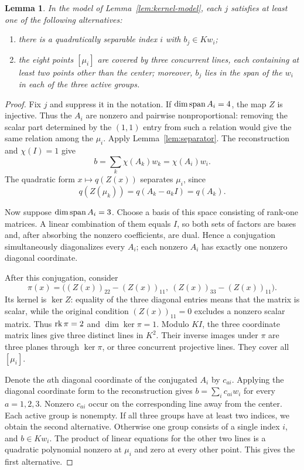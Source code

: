 \documentclass[11pt,a4paper]{article}
\numberwithin{equation}{section}
\theoremstyle{plain}
\newtheorem{lemma}[theorem]{Lemma}
\theoremstyle{definition}
\begin{document}
\begin{lemma}\label{lem:slice-dichotomy}
In the model of Lemma~\ref{lem:kernel-model}, each $j$ satisfies at
least one of the following alternatives:
\begin{enumerate}
\item there is a quadratically separable index $i$ with $b_j\in Kw_i$;
\item the eight points $[\mu_i]$ are covered by three concurrent
lines, each containing at least two points other than the center;
moreover, $b_j$ lies in the span of the $w_i$ in each of the three
active groups.
\end{enumerate}
\end{lemma}
\begin{proof}
Fix $j$ and suppress it in the notation.
If $\dim\operatorname{span} A_i=4$, the map $Z$ is injective.
Thus the $A_i$ are nonzero and pairwise nonproportional: removing
the scalar part determined by the $(1,1)$ entry from such a relation
would give the same relation among the $\mu_i$.
Apply Lemma~\ref{lem:separator}. The reconstruction and $\chi(I)=1$ give
\[
 b=\sum_k\chi(A_k)w_k=\chi(A_i)w_i.
\]
The quadratic form $x\mapsto q(Z(x))$ separates $\mu_i$, since
\[
 q(Z(\mu_k))=q(A_k-a_kI)=q(A_k).
\]

Now suppose $\dim\operatorname{span} A_i=3$. Choose a basis of this space consisting
of rank-one matrices. A linear combination of them equals $I$, so
both sets of factors are bases and, after absorbing the nonzero
coefficients, are dual. Hence a conjugation simultaneously
diagonalizes every $A_i$; each nonzero $A_i$ has exactly one nonzero
diagonal coordinate.

After this conjugation, consider
\[
 \pi(x)=\bigl((Z(x))_{22}-(Z(x))_{11},\
                 (Z(x))_{33}-(Z(x))_{11}\bigr).
\]
Its kernel is $\ker Z$: equality of the three diagonal entries means
that the matrix is scalar, while the original condition
$(Z(x))_{11}=0$ excludes a nonzero scalar matrix.
Thus $\operatorname{rk}\pi=2$ and $\dim\ker\pi=1$.
Modulo $KI$, the three coordinate matrix lines give three distinct
lines in $K^2$. Their inverse images under $\pi$ are three planes
through $\ker\pi$, or three concurrent projective lines.
They cover all $[\mu_i]$.

Denote the $a$th diagonal coordinate of the conjugated $A_i$ by $c_{ai}$.
Applying the diagonal coordinate form to the reconstruction gives
$b=\sum_i c_{ai}w_i$ for every $a=1,2,3$.
Nonzero $c_{ai}$ occur on the corresponding line away from the center.
Each active group is nonempty. If all three groups have at least two
indices, we obtain the second alternative. Otherwise one group
consists of a single index $i$, and $b\in Kw_i$.
The product of linear equations for the other two lines is a
quadratic polynomial nonzero at $\mu_i$ and zero at every other point.
This gives the first alternative.
\end{proof}
\end{document}
